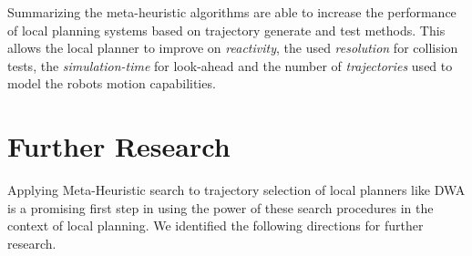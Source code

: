 Summarizing the meta-heuristic algorithms are able to increase the performance of local planning systems based on trajectory generate and test methods. This allows the local planner to improve on \emph{reactivity}, the used \emph{resolution} for collision tests, the \emph{simulation-time} for look-ahead and the number of \emph{trajectories} used to model the robots motion capabilities.

\section{Further Research}
Applying Meta-Heuristic search to trajectory selection of local planners like DWA is a promising first step in using the power of these search procedures in the context of local planning. 
We identified the following directions for further research.

